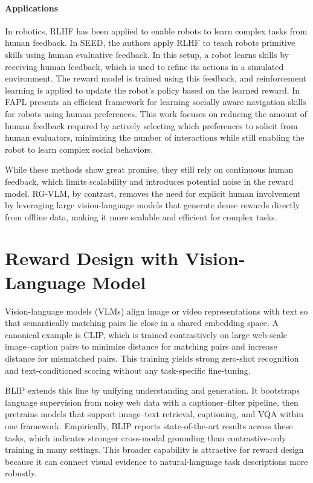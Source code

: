 \documentclass[master,english,final]{kaist-ucs}
\begin{document}
\paragraph{Applications} 
In robotics, RLHF has been applied to enable robots to learn complex tasks from human feedback. In SEED\cite{hiranaka2023primitive}, the authors apply RLHF to teach robots primitive skills using human evaluative feedback. In this setup, a robot learns skills by receiving human feedback, which is used to refine its actions in a simulated environment. The reward model is trained using this feedback, and reinforcement learning is applied to update the robot’s policy based on the learned reward. In FAPL\cite{wang2022feedback} presents an efficient framework for learning socially aware navigation skills for robots using human preferences. This work focuses on reducing the amount of human feedback required by actively selecting which preferences to solicit from human evaluators, minimizing the number of interactions while still enabling the robot to learn complex social behaviors.

While these methods show great promise, they still rely on continuous human feedback, which limits scalability and introduces potential noise in the reward model. RG-VLM, by contrast, removes the need for explicit human involvement by leveraging large vision-language models that generate dense rewards directly from offline data, making it more scalable and efficient for complex tasks.



\section{Reward Design with Vision-Language Model}
Vision-language models (VLMs) align image or video representations with text so that semantically matching pairs lie close in a shared embedding space. A canonical example is CLIP\cite{radford2021learning}, which is trained contrastively on large web-scale image–caption pairs to minimize distance for matching pairs and increase distance for mismatched pairs. This training yields strong zero-shot recognition and text-conditioned scoring without any task-specific fine-tuning. 

BLIP\cite{li2022blip} extends this line by unifying understanding and generation. It bootstraps language supervision from noisy web data with a captioner–filter pipeline, then pretrains models that support image–text retrieval, captioning, and VQA within one framework. Empirically, BLIP\cite{li2022blip} reports state-of-the-art results across these tasks, which indicates stronger cross-modal grounding than contrastive-only training in many settings. This broader capability is attractive for reward design because it can connect visual evidence to natural-language task descriptions more robustly. 
\end{document}
